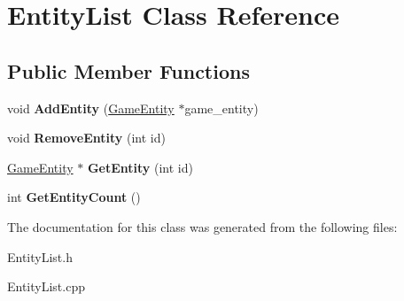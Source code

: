 \hypertarget{class_entity_list}{}\section{Entity\+List Class Reference}
\label{class_entity_list}
\subsection*{Public Member Functions}
\begin{DoxyCompactItemize}
\item 
\hypertarget{class_entity_list_a40295dd300efcf67f02d7d19bdcb1171}{}void {\bfseries Add\+Entity} (\hyperlink{class_game_entity}{Game\+Entity} $\ast$game\+\_\+entity)\label{class_entity_list_a40295dd300efcf67f02d7d19bdcb1171}

\item 
\hypertarget{class_entity_list_a413f86f5709a11be52b75fb9c765cc90}{}void {\bfseries Remove\+Entity} (int id)\label{class_entity_list_a413f86f5709a11be52b75fb9c765cc90}

\item 
\hypertarget{class_entity_list_a91aa2847a1b226bec483bb3c7453f89c}{}\hyperlink{class_game_entity}{Game\+Entity} $\ast$ {\bfseries Get\+Entity} (int id)\label{class_entity_list_a91aa2847a1b226bec483bb3c7453f89c}

\item 
\hypertarget{class_entity_list_a8f53dae433fa5b9c514a35157ad071b0}{}int {\bfseries Get\+Entity\+Count} ()\label{class_entity_list_a8f53dae433fa5b9c514a35157ad071b0}

\end{DoxyCompactItemize}


The documentation for this class was generated from the following files\+:\begin{DoxyCompactItemize}
\item 
Entity\+List.\+h\item 
Entity\+List.\+cpp\end{DoxyCompactItemize}
